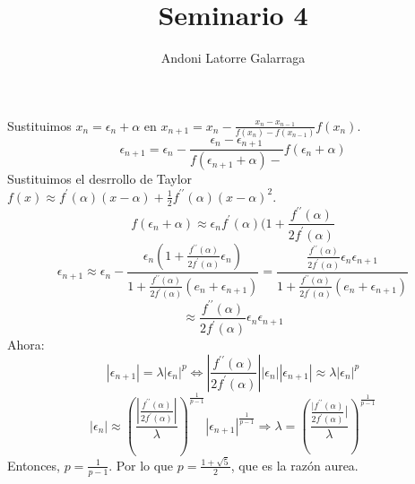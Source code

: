 \documentclass{article}
\title{Seminario 4}
\author{Andoni Latorre Galarraga}
\date{}
\begin{document}
\maketitle
Sustituimos $x_n = \epsilon_n + \alpha$ en $x_{n+1} = x_n -\frac{x_n - x_{n-1}}{f(x_n)-f(x_{n-1})}f(x_n)$.
$$
\epsilon_{n+1} = \epsilon_n - \frac{\epsilon_n-\epsilon_{n+1}}{f(\epsilon_{n+1} + \alpha)-}f(\epsilon_n + \alpha)
$$
Sustituimos el desrrollo de Taylor $f(x)\approx f^\prime(\alpha) (x-\alpha) + \frac{1}{2} f^{\prime\prime}(\alpha)(x-\alpha)^2$.
$$
f(\epsilon_n+\alpha)\approx \epsilon_n f^\prime(\alpha)(1+\frac{f^{\prime\prime}(\alpha)}{2f^\prime(\alpha)}
$$
$$
\epsilon_{n+1} \approx \epsilon_n - \frac{\epsilon_n(1+\frac{f^{\prime\prime}(\alpha)}{2f^\prime(\alpha)}\epsilon_n)}{1+ \frac{f^{\prime\prime}(\alpha)}{2f^\prime(\alpha)}(e_n + \epsilon_{n+1})}
=
\frac{\frac{f^{\prime\prime}(\alpha)}{2f^\prime(\alpha)}\epsilon_n \epsilon_{n+1}}{1+ \frac{f^{\prime\prime}(\alpha)}{2f^\prime(\alpha)}(e_n + \epsilon_{n+1})}
$$
$$
\approx \frac{f^{\prime\prime}(\alpha)}{2f^\prime(\alpha)}\epsilon_n \epsilon_{n+1}
$$
Ahora:
$$
|\epsilon_{n+1}| = \lambda |\epsilon_n|^p \iff |\frac{f^{\prime\prime}(\alpha)}{2f^\prime(\alpha)}||\epsilon_n||\epsilon_{n+1}| \approx \lambda |\epsilon_n|^p
$$
$$
|\epsilon_n| \approx \left( \frac{|\frac{f^{\prime\prime}(\alpha)}{2f^\prime(\alpha)}|}{\lambda}\right)^{\frac{1}{p-1}} |\epsilon_{n+1}|^{\frac{1}{p-1}}
\Rightarrow
\lambda = \left( \frac{\frac{|f^{\prime\prime}(\alpha)}{2f^\prime(\alpha)}|}{\lambda}\right)^{\frac{1}{p-1}}
$$
Entonces, $p = \frac{1}{p-1}$. Por lo que $p = \frac{1+ \sqrt{5}}{2}$, que es la razón aurea.
\end{document}
